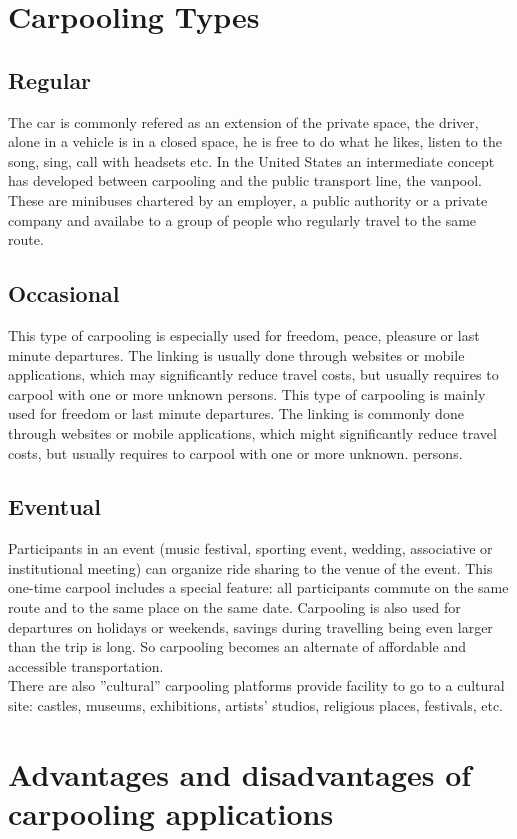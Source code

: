 \section{Carpooling Types}
\subsection{Regular}
The car is commonly refered as an extension of the private space, the driver, alone in a vehicle is in a closed space, he is free to do what he likes, listen to the song, sing, call with headsets etc. In the United States an intermediate concept has developed between carpooling and the public transport line, the vanpool. These are minibuses chartered by an employer, a public authority or a private company and availabe to a group of people who regularly travel to the same route.

\subsection{Occasional}
This type of carpooling is especially used for freedom, peace, pleasure or last minute departures. The linking is usually done through websites or mobile applications, which may signiﬁcantly reduce travel costs, but usually requires to carpool with one or more unknown persons. This type of carpooling is mainly used for freedom or last minute departures. The linking is commonly done through websites or mobile applications, which might signiﬁcantly reduce travel costs, but usually requires to carpool with one or more unknown. persons.

\subsection{Eventual}
Participants in an event (music festival, sporting event, wedding, associative or institutional meeting) can organize ride sharing to the venue of the event. This one-time carpool includes a special feature: all participants commute on the same route and to the same place on the same date. Carpooling is also used for departures on holidays or weekends, savings during travelling being even larger than the trip is long. So carpooling becomes an alternate of aﬀordable and accessible transportation.\\

There are also ”cultural” carpooling platforms provide facility to go to a cultural site: castles, museums, exhibitions, artists’ studios, religious places, festivals, etc.
\section{Advantages and disadvantages of carpooling applications}
